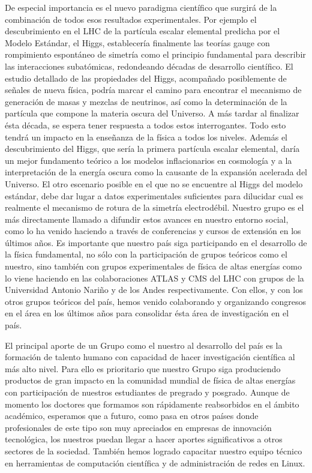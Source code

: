 De especial importancia es el nuevo paradigma científico que surgirá
de la combinación de todos esos resultados experimentales. Por ejemplo
el descubrimiento en el LHC de la partícula escalar elemental predicha
por el Modelo Estándar, el Higgs, establecería finalmente las teorías
gauge con rompimiento espontáneo de simetría como el principio
fundamental para describir las interacciones subatómicas, redondeando
décadas de desarrollo científico.  El estudio detallado de las
propiedades del Higgs, acompañado posiblemente de señales
de nueva física, podría marcar el camino para encontrar el mecanismo
de generación de masas y mezclas de neutrinos, así como la
determinación de la partícula que compone la materia oscura del
Universo. A más tardar al finalizar ésta década, se espera tener
respuesta a todos estos interrogantes. Todo esto tendrá un impacto en la
enseñanza de la física a todos los niveles. Además el descubrimiento
del Higgs, que sería la primera partícula escalar elemental, daría un
mejor fundamento teórico a los modelos inflacionarios en cosmología y
a la interpretación de la energía oscura como la causante de la
expansión acelerada del Universo. El otro escenario posible en el que
no se encuentre al Higgs del modelo estándar, debe dar lugar a datos
experimentales suficientes para dilucidar cual es realmente el
mecanismo de rotura de la simetría electrodébil. Nuestro grupo es el
más directamente llamado a difundir estos avances en nuestro entorno social,
como lo ha venido haciendo a través de conferencias y cursos de
extensión en los últimos años. Es importante que nuestro país siga
participando en el desarrollo de la física fundamental, no sólo con la
participación de grupos teóricos como el nuestro, sino también con
grupos experimentales de física de altas energías como lo viene
haciendo en las colaboraciones ATLAS y CMS del LHC con grupos de la
Universidad Antonio Nariño y de los Andes respectivamente. Con ellos,
y con los otros grupos teóricos del país, hemos venido colaborando y
organizando congresos en el área en los últimos años para consolidar
ésta área de investigación en el país.

El principal aporte de un Grupo como el nuestro al desarrollo del país
es la formación de talento humano con capacidad de hacer investigación
científica al más alto nivel. Para ello es prioritario que nuestro
Grupo siga produciendo productos de gran impacto en la comunidad
mundial de física de altas energías con participación de nuestros
estudiantes de pregrado y posgrado.  Aunque de momento los doctores
que formamos son rápidamente reabsorbidos en el ámbito académico,
esperamos que a futuro, como pasa en otros países donde profesionales
de este tipo son muy apreciados en empresas de innovación tecnológica,
los nuestros puedan llegar a hacer aportes significativos a otros
sectores de la sociedad. También hemos logrado capacitar nuestro
equipo técnico en herramientas de computación científica y de
administración de redes en Linux.


